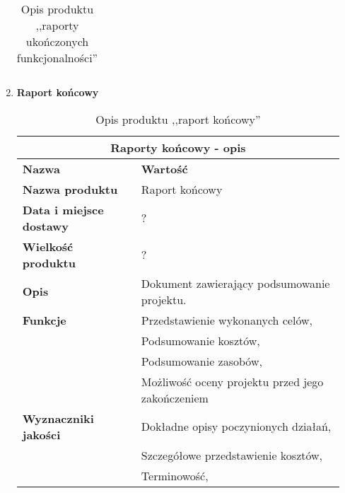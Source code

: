 \documentclass[12pt,a4paper]{article}
\begin{document}
\begin{enumerate}
\begin{table}[htb]
\begin{tabular}{|p{0.35\linewidth} | p{0.6\linewidth}|}
      \hline
      \end{tabular}
    \caption{Opis produktu ,,raporty ukończonych funkcjonalności''}
    \label{tab:produkt2}
    \end{table}
    \newpage
    \item \textbf{Raport końcowy}
    \begin{table}[htb]
    \centering
      \begin{tabular}{|p{0.35\linewidth} | p{0.6\linewidth}|}
      \hline
      \multicolumn{2}{|c|}{Raporty końcowy - opis} \\
      \hline
      {\bf Nazwa} & {\bf Wartość} \\
      \hline
      \textbf{Nazwa produktu} & Raport końcowy \\
      \hline
      \textbf{Data i miejsce dostawy} & ? \\
      \hline
      \textbf{Wielkość produktu} & ? \\
      \hline
      \textbf{Opis} & Dokument zawierający podsumowanie projektu.  \\
      \hline
      \textbf{Funkcje} 
                      & Przedstawienie wykonanych celów, \\
                      & Podsumowanie kosztów, \\
                      & Podsumowanie zasobów, \\
                      & Możliwość oceny projektu przed jego zakończeniem \\
      \hline
      \textbf{Wyznaczniki jakości} 
                      & Dokładne opisy poczynionych działań, \\
                      & Szczegółowe przedstawienie kosztów, \\
                      & Terminowość, \\
      \hline
      \end{tabular}
    \caption{Opis produktu ,,raport końcowy''}
    \label{tab:produkt3}
    \end{table}
\end{enumerate}

\newpage
\end{document}
